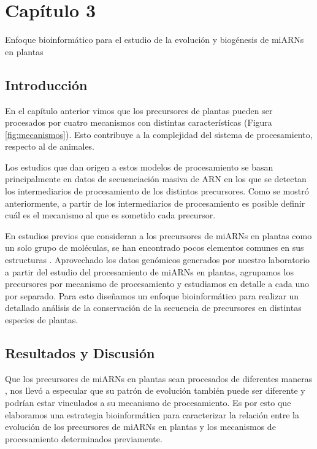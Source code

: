 
\graphicspath{{Chapter3/Figs/}}

\setcounter{chapter}{6}
\chapter*{Capítulo 3} 
\setcounter{figure}{0}
\setcounter{section}{0}

{\LARGE Enfoque bioinformático para el estudio de la evolución y biogénesis de miARNs en plantas}


\section{Introducción}

En el capítulo anterior vimos que los precursores de plantas pueden ser procesados por cuatro mecanismos con distintas características (Figura \ref{fig:mecanismos}).
Esto contribuye a la complejidad del sistema de procesamiento, respecto al de animales.

Los estudios que dan origen a estos modelos de procesamiento se basan principalmente en datos de secuenciación masiva de ARN en los que se detectan los intermediarios de procesamiento de los distintos precursores.
Como se mostró anteriormente, a partir de los intermediarios de procesamiento es posible definir cuál es el mecanismo al que es sometido cada precursor.

En estudios previos que consideran a los precursores de miARNs en plantas como un solo grupo de moléculas, se han encontrado pocos elementos comunes en sus estructuras \citep{Mateos2010}.
Aprovechado los datos genómicos generados por nuestro laboratorio a partir del estudio del procesamiento de miARNs en plantas, agrupamos los precursores por mecanismo de procesamiento y estudiamos en detalle a cada uno por separado.
Para esto diseñamos un enfoque bioinformático para realizar un detallado análisis de la conservación de la secuencia de precursores en distintas especies de plantas.

\section{Resultados y Discusión}



Que los precursores de miARNs en plantas sean procesados de diferentes maneras \citep{Bologna2013}, nos llevó a especular que su patrón de evolución también puede ser diferente y podrían estar vinculados a su mecanismo de procesamiento.
Es por esto que elaboramos una estrategia bioinformática para caracterizar la relación entre la evolución de los precursores de miARNs en plantas y los mecanismos de procesamiento determinados previamente.

